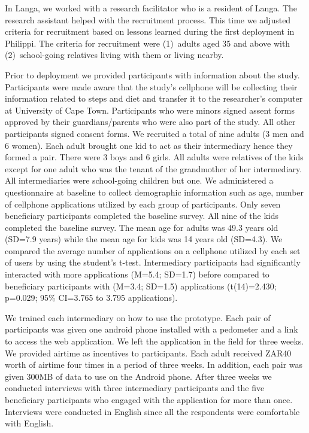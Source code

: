 \documentclass{sig-alternate}
\begin{document}
In Langa, we worked with a research facilitator who is a resident of Langa. 
The research assistant helped with the recruitment process. This time we 
adjusted criteria for recruitment based on lessons learned during the first 
deployment in Philippi. The criteria for recruitment were (1)~adults aged 35 
and above with (2)~school-going 
relatives living with them or living nearby.

Prior to deployment we provided participants with information about the study.
Participants were made aware that the study's cellphone will be collecting
their information related to steps and diet and transfer it to the
researcher's computer at University of Cape Town. Participants who were minors
signed assent forms approved by their guardians/parents who were also part of
the study. All other participants signed consent forms.   We recruited a total
of nine adults (3 men and 6 women). Each adult brought one kid to act as their
intermediary hence they formed a pair. There were 3 boys and 6 girls. All
adults were relatives of the kids except for one adult who was the tenant of
the grandmother of her intermediary. All intermediaries were school-going
children but one.  We administered a questionnaire at baseline to collect
demographic information such as age, number of cellphone applications utilized
by each group of participants. Only seven beneficiary participants completed
the baseline survey. All nine of the kids completed the baseline survey. The mean age
for adults was 49.3 years old (SD=7.9 years) while the mean age for kids
was 14 years old (SD=4.3). We compared the average number of applications on a cellphone utilized by each set of users by using the student's t-test. Intermediary participants had significantly interacted with more applications (M=5.4; SD=1.7) before
compared to beneficiary participants with (M=3.4; SD=1.5) applications
(t(14)=2.430; p=0.029; 95\% CI=3.765 to 3.795 applications). 

We trained each intermediary on how to use the prototype. Each pair of participants was
given one android phone installed with a pedometer and a link to access the
web application. We left the application in the field for three weeks. We
provided airtime as incentives to participants. Each adult received ZAR40
worth of airtime four times in a period of three weeks. In addition,
each pair was given 300MB of data to use on the Android phone. After three
weeks we conducted interviews with three intermediary participants and the five
beneficiary participants who engaged with the application for more than once.
Interviews were conducted in English since all the respondents were
comfortable with English.
\end{document}
